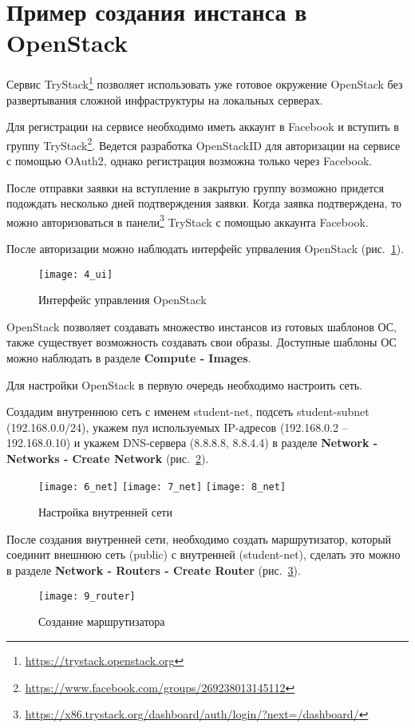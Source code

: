 \section{Пример создания инстанса в OpenStack} \label{pril:f}

Сервис TryStack\footnote{\url{https://trystack.openstack.org}} позволяет использовать уже готовое окружение OpenStack без развертывания сложной инфраструктуры на локальных серверах.

Для регистрации на сервисе необходимо иметь аккаунт в Facebook и вступить в группу TryStack\footnote{\url{https://www.facebook.com/groups/269238013145112}}.
Ведется разработка OpenStackID для авторизации на сервисе с помощью OAuth2, однако регистрация возможна только через Facebook.

После отправки заявки на вступление в закрытую группу возможно придется подождать несколько дней подтверждения заявки.
Когда заявка подтверждена, то можно авторизоваться в панели\footnote{\url{https://x86.trystack.org/dashboard/auth/login/?next=/dashboard/}} TryStack с помощью аккаунта Facebook.

После авторизации можно наблюдать интерфейс упрваления OpenStack (рис.~\ref{pic:ui}).
\begin{figure}[ht]
    \centering
    \texttt{[image: 4\_ui]}
    \caption{Интерфейс управления OpenStack}\label{pic:ui}
\end{figure}

OpenStack позволяет создавать множество инстансов из готовых шаблонов ОС, также существует возможность создавать свои образы.
Доступные шаблоны ОС можно наблюдать в разделе \textbf{Compute - Images}.

Для настройки OpenStack в первую очередь необходимо настроить сеть.

Создадим внутреннюю сеть с именем student-net, подсеть student-subnet (192.168.0.0/24), укажем пул используемых IP-адресов (192.168.0.2 -- 192.168.0.10) и укажем DNS-сервера (8.8.8.8, 8.8.4.4) в разделе \textbf{Network - Networks - Create Network} (рис.~\ref{pic:net}).
\begin{figure}[ht]
    \centering
    \texttt{[image: 6\_net]}
    \texttt{[image: 7\_net]}
    \texttt{[image: 8\_net]}
    \caption{Настройка внутренней сети}\label{pic:net}
\end{figure}

\clearpage

После создания внутренней сети, необходимо создать маршрутизатор, который соединит внешнюю сеть (public) с внутренней (student-net), сделать это можно в разделе \textbf{Network - Routers - Create Router} (рис.~\ref{pic:router}).
\begin{figure}[ht]
    \centering
    \texttt{[image: 9\_router]}
    \caption{Создание маршрутизатора}\label{pic:router}
\end{figure}

